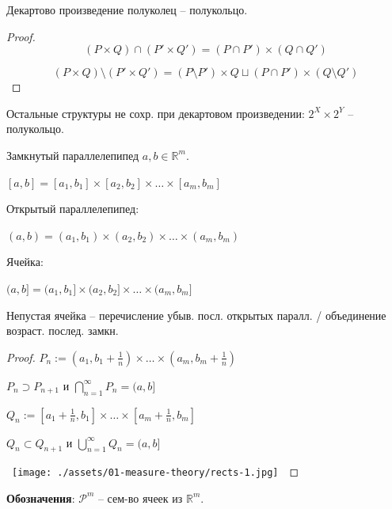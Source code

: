 \begin{theorem}
    Декартово произведение полуколец -- полукольцо.
\end{theorem}
\begin{proof}
    
    $$(P \times Q) \cap (P' \times Q') = (P \cap P') \times (Q \cap Q')$$

    $$(P \times Q) \setminus (P' \times Q') = (P \setminus P') \times Q \sqcup (P \cap P') \times (Q \setminus Q')$$
\end{proof}

\begin{remark}
    Остальные структуры не сохр. при декартовом произведении: $2^X \times 2^Y$ -- полукольцо.
\end{remark}

\begin{definition}
    Замкнутый параллелепипед $a, b \in \mathbb{R}^m$.

    $[a, b] = [a_1, b_1] \times [a_2, b_2] \times \dots \times [a_m, b_m]$

    Открытый параллелепипед:

    $(a, b) = (a_1, b_1) \times (a_2, b_2) \times \dots \times (a_m, b_m)$

    Ячейка:
    
    $(a, b] = (a_1, b_1] \times (a_2, b_2] \times \dots \times (a_m, b_m]$
\end{definition}

\begin{theorem}
    Непустая ячейка -- перечисление убыв. посл. открытых паралл. / объединение возраст. послед. замкн.
\end{theorem}

\begin{proof}

    $P_n := (a_1, b_1 + \frac{1}{n}) \times \dots \times (a_m, b_m + \frac{1}{n})$

    $P_n \supset P_{n+1}$ и $\bigcap_{n=1}^{\infty}P_n = (a, b]$

    $Q_n := [a_1 + \frac{1}{n}, b_1] \times \dots \times [a_m + \frac{1}{n}, b_m]$

    $Q_n \subset Q_{n+1}$ и $\bigcup_{n=1}^{\infty}Q_n = (a, b]$ 

    \hbox{
        \texttt{[image: ./assets/01-measure-theory/rects-1.jpg]}
    }

\end{proof}

\textbf{Обозначения}: $\mathcal{P}^m$ -- сем-во ячеек из $\mathbb{R}^m$.

